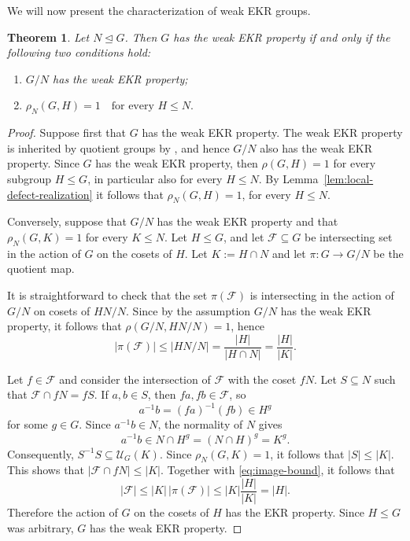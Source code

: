 \documentclass[11pt]{article}
\newtheorem{theorem}{Theorem}[section]
\begin{document}
We will now present the characterization of weak EKR groups.

\begin{theorem}
\label{thm:normal-extension}
Let \(N\trianglelefteq G\). Then \(G\) has the weak EKR property if
and only if the following two conditions hold:
\begin{enumerate}
\item \(G/N\) has the weak EKR property;
\item
\(
\rho_N(G,H)=1
\quad\text{for every }H\leq N.
\)
\end{enumerate}
\end{theorem}

\begin{proof}
Suppose first that \(G\) has the weak EKR property. The weak EKR
property is inherited by quotient groups by \cite[Lemma 4]{BardestaniMallahiKarai2015}, and hence \(G/N\) also has the
weak EKR property. Since $G$ has the weak EKR property, then $\rho(G,H)=1$ for every subgroup $H\leq G$, in particular also for every $H\leq N$. By Lemma~\ref{lem:local-defect-realization} it follows that $\rho_N(G,H)=1$, for every $H\leq N$.


Conversely, suppose that \(G/N\) has the weak EKR property and that
\(
\rho_N(G,K)=1\)
for every \(K\leq N.
\)
Let \(H\leq G\), and let \(\mathcal{F}\subseteq G\) be intersecting set in
the action of \(G\) on the cosets of \(H\). Let
\(
K:=H\cap N
\)
and let
\(
\pi:G\rightarrow G/N
\)
be the quotient map.

It is straightforward to check that the set \(\pi(\mathcal{F})\) is intersecting in the action
of \(
G/N \) on  cosets of $HN/N$.
Since by the assumption \(G/N\) has the weak EKR property, it follows that $\rho(G/N,HN/N)=1$, hence
\begin{equation}    
|\pi(\mathcal{F})|
 \leq
 |HN/N|
 =
 \frac{|H|}{|H\cap N|}
 =
 \frac{|H|}{|K|}.
\label{eq:image-bound}
\end{equation}

Let $f\in \mathcal{F}$ and consider the intersection of $\mathcal{F}$ with the coset $fN$.  Let $S\subseteq N$ such that $\mathcal{F} \cap fN=fS$. If \(a,b\in S\), then \(fa,fb\in
\mathcal{F}\), so
\[
a^{-1}b=(fa)^{-1}(fb)\in H^g
\]
for some \(g\in G\). Since \(a^{-1}b\in N\), the normality of \(N\) gives
\[
a^{-1}b
 \in
 N\cap H^g
 =
 (N\cap H)^g
 =
 K^g.
\]
Consequently,
\(
S^{-1}S\subseteq \mathcal{U}_G(K).
\)
Since \(\rho_N(G,K)=1\), it follows that
\(
|S|
 \leq |K|.
\) 
This shows that $|\mathcal{F}\cap fN|\leq |K|$.
Together with \eqref{eq:image-bound}, it follows that
\[
|\mathcal{F}|
 \leq
 |K|\,|\pi(\mathcal{F})|
 \leq
 |K|\frac{|H|}{|K|}
 =
 |H|.
\]
Therefore the action of \(G\) on the cosets of \(H\) has the EKR property. Since
\(H\leq G\) was arbitrary, \(G\) has the weak EKR property.
\end{proof}
\end{document}
